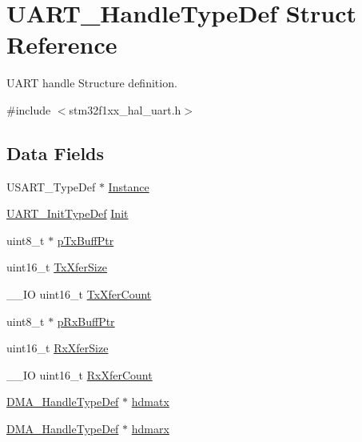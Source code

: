 \hypertarget{struct_u_a_r_t___handle_type_def}{}\section{U\+A\+R\+T\+\_\+\+Handle\+Type\+Def Struct Reference}
\label{struct_u_a_r_t___handle_type_def}


U\+A\+RT handle Structure definition.  




{\ttfamily \#include $<$stm32f1xx\+\_\+hal\+\_\+uart.\+h$>$}

\subsection*{Data Fields}
\begin{DoxyCompactItemize}
\item 
U\+S\+A\+R\+T\+\_\+\+Type\+Def $\ast$ \hyperlink{struct_u_a_r_t___handle_type_def_a2b30b6d22df80fbebd8ceefc6f162310}{Instance}
\item 
\hyperlink{struct_u_a_r_t___init_type_def}{U\+A\+R\+T\+\_\+\+Init\+Type\+Def} \hyperlink{struct_u_a_r_t___handle_type_def_a6b5ab0619ea07655a7f3bc92f78fafaa}{Init}
\item 
uint8\+\_\+t $\ast$ \hyperlink{struct_u_a_r_t___handle_type_def_a5cc31f7c52dafd32f27f8f2756dbf343}{p\+Tx\+Buff\+Ptr}
\item 
uint16\+\_\+t \hyperlink{struct_u_a_r_t___handle_type_def_a80907b65d6f9541bc0dee444d16bc45b}{Tx\+Xfer\+Size}
\item 
\+\_\+\+\_\+\+IO uint16\+\_\+t \hyperlink{struct_u_a_r_t___handle_type_def_a1823437fbed80bdd1510782ced4e5532}{Tx\+Xfer\+Count}
\item 
uint8\+\_\+t $\ast$ \hyperlink{struct_u_a_r_t___handle_type_def_a7cee540cb21048ac48ba17355440e668}{p\+Rx\+Buff\+Ptr}
\item 
uint16\+\_\+t \hyperlink{struct_u_a_r_t___handle_type_def_ac12f5f1f6295b3c3327d5feabf5a96fb}{Rx\+Xfer\+Size}
\item 
\+\_\+\+\_\+\+IO uint16\+\_\+t \hyperlink{struct_u_a_r_t___handle_type_def_ad95a26d6b12b7087bba3d1b769175db2}{Rx\+Xfer\+Count}
\item 
\hyperlink{group___d_m_a___exported___types_ga92b907d56a9c29b93d46782a7a04f91e}{D\+M\+A\+\_\+\+Handle\+Type\+Def} $\ast$ \hyperlink{struct_u_a_r_t___handle_type_def_a33e13c28b1a70e6164417abb026d7a22}{hdmatx}
\item 
\hyperlink{group___d_m_a___exported___types_ga92b907d56a9c29b93d46782a7a04f91e}{D\+M\+A\+\_\+\+Handle\+Type\+Def} $\ast$ \hyperlink{struct_u_a_r_t___handle_type_def_abd0aeec20298a55d89a440320e35634f}{hdmarx}

\end{DoxyCompactItemize}

